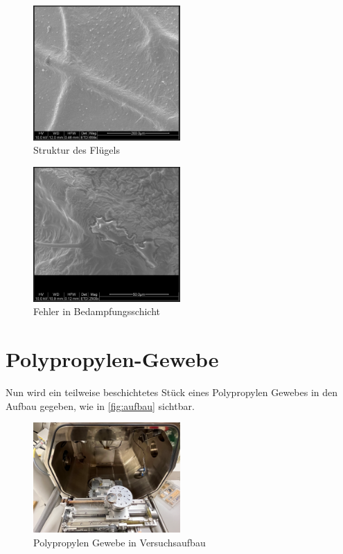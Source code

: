 \documentclass[12pt,english,ngerman]{scrartcl}
\begin{document}
\begin{figure}[H]
	\begin{center}
		\includegraphics[width =0.5\textwidth]{./figures/flugel.png}
	\end{center}
	\caption{Struktur des Flügels}
    \label{fig:flugel}
\end{figure}

\begin{figure}[H]
	\begin{center}
		\includegraphics[width =0.5\textwidth]{./figures/damage.png}
	\end{center}
	\caption{Fehler in Bedampfungsschicht}
    \label{fig:damage}
\end{figure}


\section{Polypropylen-Gewebe}

Nun wird ein teilweise beschichtetes Stück eines Polypropylen Gewebes in den Aufbau gegeben, wie in \autoref{fig:aufbau} sichtbar.

\begin{figure}[H]
	\begin{center}
		\includegraphics[width =0.5\textwidth]{./figures/aufbau.png}
	\end{center}
	\caption{Polypropylen Gewebe in Versuchsaufbau}
    \label{fig:aufbau}
\end{figure}
\end{document}
